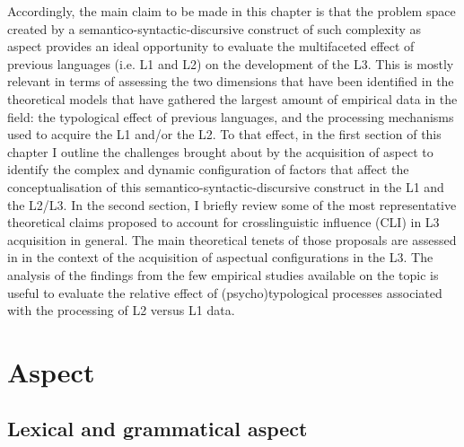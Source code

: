 \documentclass[output=paper,modfonts,nonflat,newtxmath]{langsci/langscibook}
\begin{document}
Accordingly, the main claim to be made in this chapter is that the problem space created by a semantico-syntactic-discursive construct of such complexity as aspect provides an ideal opportunity to evaluate the multifaceted effect of previous languages (i.e. L1 and L2) on the development of the L3. This is mostly relevant in terms of assessing the two dimensions that have been identified in the theoretical models that have gathered the largest amount of empirical data in the field: the typological effect of previous languages, and the processing mechanisms used to acquire the L1 and/or the L2. To that effect, in the first section of this chapter I outline the challenges brought about by the acquisition of aspect to identify the complex and dynamic configuration of factors that affect the conceptualisation of this semantico-syntactic-discursive construct in the L1 and the L2/L3. In the second section, I briefly review some of the most representative theoretical claims proposed to account for crosslinguistic influence (CLI) in L3 acquisition in general. The main theoretical tenets of those proposals are assessed in  in the context of the acquisition of aspectual configurations in the L3. The analysis of the findings from the few empirical studies available on the topic is useful to evaluate the relative effect of (psycho)typological processes associated with the processing of L2 versus L1 data.

\section{Aspect} %
\label{sec:salaberry:1}

\subsection{Lexical and grammatical aspect}
\label{sec:salaberry:1.1}
\end{document}
